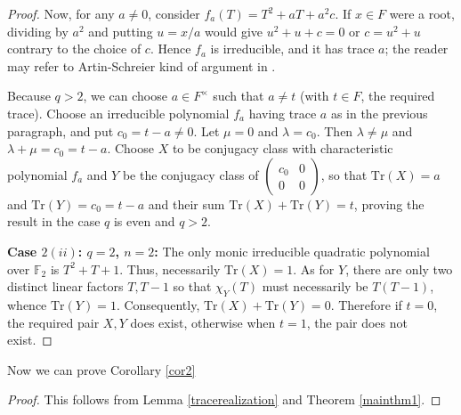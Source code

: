 \documentclass[preprint,11pt]{amsart}
\def\F{\mathbb{F}}
\theoremstyle{definition}
\numberwithin{thm}{section}
\def\F{\mathbb{F}}
\newcommand{\lam}{\lambda}
\newcommand{\tr}{\textrm{Tr}}
\begin{document}
\begin{proof}
Now, for any $a \neq 0$, consider $f_a(T) = T^2 + aT + a^2 c$. If $x \in F$ were a root, dividing by $a^2$ and putting $u = x/a$ would give $u^2 + u + c = 0$ or $c = u^2 + u$ contrary to the choice of $c$. Hence $f_a$ is irreducible, and it has trace $a$; the reader may refer to Artin-Schreier kind of argument in \cite{Gl}.

Because $q > 2$, we can choose $a \in F^{\times}$ such that $a \neq t$ (with $t \in F$, the required trace). Choose an irreducible polynomial $f_a$ having trace $a$ as in the previous paragraph, and put $c_0 = t - a \neq 0$. Let $\mu =0$ and $\lam = c_0$. Then $\lam \neq \mu$ and $\lam + \mu = c_0 = t -a$. Choose $X$ to be conjugacy class with characteristic polynomial $f_a$ and $Y$ be the conjugacy class of $\begin{pmatrix} c_0 & 0 \\ 0 & 0 \end{pmatrix}$, so that $\tr(X) = a$ and $\tr(Y) = c_0 = t- a$ and their sum $\tr(X) + \tr(Y) = t$, proving the result in the case $q$ is even and $q > 2$.

\noindent \textbf{Case $2(ii)$: $q = 2$, $n = 2$:}
The only monic irreducible quadratic polynomial over $\F_2$ is $T^2 + T+ 1$. Thus, necessarily $\tr(X) = 1$. As for $Y$, there are only two distinct linear factors $T, T-1$ so that $\chi_Y(T)$ must necessarily be $T(T-1)$, whence $\tr(Y) = 1$. Consequently, $\tr(X) + \tr(Y) = 0$. Therefore if $t = 0$, the required pair $X, Y$  does  exist, otherwise when $t =1$, the pair does not exist. 
\end{proof}

Now we can prove Corollary \ref{cor2}
\begin{proof}
This follows from Lemma \ref{tracerealization} and Theorem \ref{mainthm1}.
\end{proof}
\end{document}

